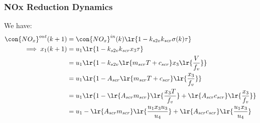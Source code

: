 \subsubsection{NOx Reduction Dynamics}
We have:
\begin{align*}
    \con{NO_x}^{out} (k + 1) &= \con{NO_x}^{in} (k) \lr{1 - k_{s2v} k_{scr} \sigma(k) \tau}\\
    \implies x_1 (k+1) &= u_1 \lr{1 - k_{s2v} k_{scr} x_3 \tau}\\
                    &= u_1 \lr{1 - k_{s2v}\lr{m_{scr}T + c_{scr}} x_3 \lr{\frac{V}{f_v}}}\\
                    &= u_1 \lr{1 - A_{scr}\lr{m_{scr}T + c_{scr}} \lr{\frac{x_3}{f_v}}}\\
                    &= u_1 \lr{1 - \lr{A_{scr}m_{scr}} \lr{\frac{x_3 T}{f_v}} + \lr{A_{scr}c_{scr}} \lr{\frac{x_3}{f_v}}}\\
                    &= u_1 - \lr{A_{scr}m_{scr}} \lr{\frac{u_1 x_3 u_3}{u_4}} + \lr{A_{scr}c_{scr}} \lr{\frac{u_1 x_3}{u_4}}
\end{align*}
